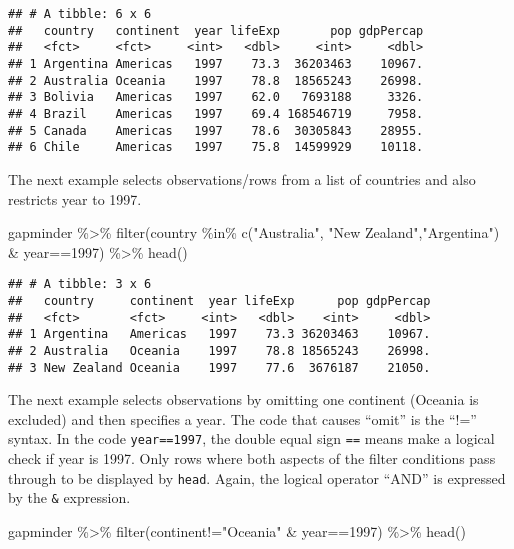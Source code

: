 \documentclass[
]{book}
\newenvironment{Shaded}{\begin{snugshade}}{\end{snugshade}}
\newcommand{\DecValTok}[1]{\textcolor[rgb]{0.00,0.00,0.81}{#1}}
\newcommand{\FunctionTok}[1]{\textcolor[rgb]{0.00,0.00,0.00}{#1}}
\newcommand{\NormalTok}[1]{#1}
\newcommand{\SpecialCharTok}[1]{\textcolor[rgb]{0.00,0.00,0.00}{#1}}
\newcommand{\StringTok}[1]{\textcolor[rgb]{0.31,0.60,0.02}{#1}}
\begin{document}
\begin{verbatim}
## # A tibble: 6 x 6
##   country   continent  year lifeExp       pop gdpPercap
##   <fct>     <fct>     <int>   <dbl>     <int>     <dbl>
## 1 Argentina Americas   1997    73.3  36203463    10967.
## 2 Australia Oceania    1997    78.8  18565243    26998.
## 3 Bolivia   Americas   1997    62.0   7693188     3326.
## 4 Brazil    Americas   1997    69.4 168546719     7958.
## 5 Canada    Americas   1997    78.6  30305843    28955.
## 6 Chile     Americas   1997    75.8  14599929    10118.
\end{verbatim}

The next example selects observations/rows from a list of countries and also restricts year to 1997.

\begin{Shaded}
\begin{Highlighting}[]
\NormalTok{gapminder }\SpecialCharTok{\%\textgreater{}\%} 
  \FunctionTok{filter}\NormalTok{(country }\SpecialCharTok{\%in\%} \FunctionTok{c}\NormalTok{(}\StringTok{"Australia"}\NormalTok{, }\StringTok{"New Zealand"}\NormalTok{,}\StringTok{"Argentina"}\NormalTok{) }\SpecialCharTok{\&}\NormalTok{ year}\SpecialCharTok{==}\DecValTok{1997}\NormalTok{) }\SpecialCharTok{\%\textgreater{}\%} 
  \FunctionTok{head}\NormalTok{()}
\end{Highlighting}
\end{Shaded}

\begin{verbatim}
## # A tibble: 3 x 6
##   country     continent  year lifeExp      pop gdpPercap
##   <fct>       <fct>     <int>   <dbl>    <int>     <dbl>
## 1 Argentina   Americas   1997    73.3 36203463    10967.
## 2 Australia   Oceania    1997    78.8 18565243    26998.
## 3 New Zealand Oceania    1997    77.6  3676187    21050.
\end{verbatim}

The next example selects observations by omitting one continent (Oceania is excluded) and then specifies a year. The code that causes ``omit'' is the ``!='' syntax. In the code \texttt{year==1997}, the double equal sign \texttt{==} means make a logical check if year is 1997. Only rows where both aspects of the filter conditions pass through to be displayed by \texttt{head}. Again, the logical operator ``AND'' is expressed by the \texttt{\&} expression.

\begin{Shaded}
\begin{Highlighting}[]
\NormalTok{gapminder }\SpecialCharTok{\%\textgreater{}\%} 
  \FunctionTok{filter}\NormalTok{(continent}\SpecialCharTok{!=}\StringTok{"Oceania"} \SpecialCharTok{\&}\NormalTok{ year}\SpecialCharTok{==}\DecValTok{1997}\NormalTok{) }\SpecialCharTok{\%\textgreater{}\%} 
  \FunctionTok{head}\NormalTok{()}
\end{Highlighting}
\end{Shaded}
\end{document}
